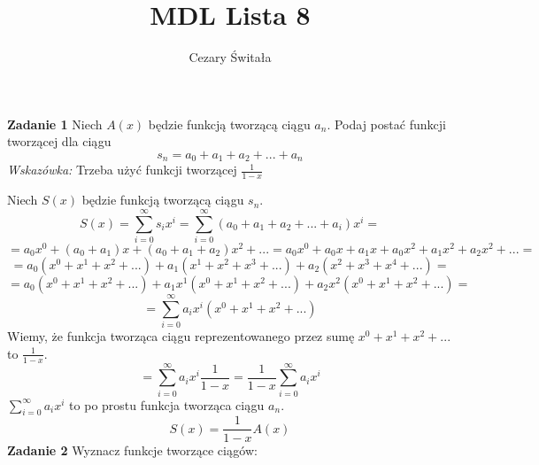 \documentclass[12pt,a4paper]{article}
\title{MDL Lista 8}
\author{Cezary Świtała}
\begin{document}
\maketitle

\noindent
\textbf{Zadanie 1} Niech \( A(x) \) będzie funkcją tworzącą ciągu \( a_n \). Podaj postać funkcji tworzącej
dla ciągu
\[
	s_n = a_0 + a_1 + a_2 + ... + a_n 
\]
\textit{Wskazówka:} Trzeba użyć funkcji tworzącej \( \frac{1}{1-x}\)
\vskip 0.2cm

Niech \( S(x) \) będzie funkcją tworzącą ciągu \( s_n \).
\[
	S(x) = \sum_{i=0}^\infty s_i x^i = \sum_{i=0}^\infty ( a_0 + a_1 + a_2 + ... + a_i )x^i = 
\]
\[
	= a_0 x^0 + (a_0 + a_1)x + (a_0 + a_1 + a_2) x^2 + ...
	= a_0 x^0 + a_0 x + a_1 x + a_0 x^2 + a_1 x^2 + a_2 x^2 + ... = 
\]
\[
	= a_0( x^0 + x^1 + x^2 + ...) + a_1( x^1 + x^2 + x^3 + ...) + a_2( x^2 + x^3 + x^4 + ...) =
\]
\[
	= a_0( x^0 + x^1 + x^2 + ...) + a_1x^1( x^0 + x^1 + x^2 + ...) + a_2x^2( x^0 + x^1 + x^2 + ...) =
\]
\[
	= \sum_{i=0}^\infty a_i x^i ( x^0 + x^1 + x^2 + ...)
\]
Wiemy, że funkcja tworząca ciągu reprezentowanego przez sumę \( x^0 + x^1 + x^2 + ...\) to \( \frac{1}{1-x}\).
\[
	= \sum_{i=0}^\infty a_i x^i \frac{1}{1-x}
	= \frac{1}{1-x} \sum_{i=0}^\infty a_i x^i 
\]
\( \sum_{i=0}^\infty a_i x^i  \) to po prostu funkcja tworząca ciągu \(a_n\).
\[
	S(x) = \frac{1}{1-x} A(x)
\]
\newpage
\noindent
\textbf{Zadanie 2} Wyznacz funkcje tworzące ciągów:
\end{document}
